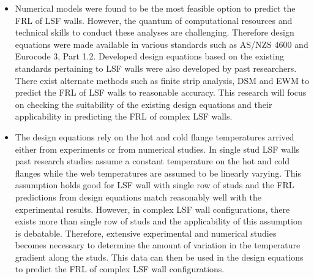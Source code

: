 \begin{itemize}
	\item Numerical models were found to be the most feasible option to predict the FRL of LSF walls. However, the quantum of computational resources and technical skills to conduct these analyses are challenging. Therefore design equations were made available in various standards such as AS/NZS 4600 and Eurocode 3, Part 1.2. Developed design equations based on the existing standards pertaining to LSF walls were also developed by past researchers. There exist alternate methods such as finite strip analysis, DSM and EWM to predict the FRL of LSF walls to reasonable accuracy. This research will focus on checking the suitability of the existing design equations and their applicability in predicting the FRL of complex LSF walls.
	\item The design equations rely on the hot and cold flange temperatures arrived either from experiments or from numerical studies. In single stud LSF walls past research studies assume a constant temperature on the hot and cold flanges while the web temperatures are assumed to be linearly varying. This assumption holds good for LSF wall with single row of studs and the FRL predictions from design equations match reasonably well with the experimental results. However, in complex LSF wall configurations, there exists more than single row of studs and the applicability of this assumption is debatable. Therefore, extensive experimental and numerical studies becomes necessary to determine the amount of variation in the temperature gradient along the studs. This data can then be used in the design equations to predict the FRL of complex LSF wall configurations.  
\end{itemize}